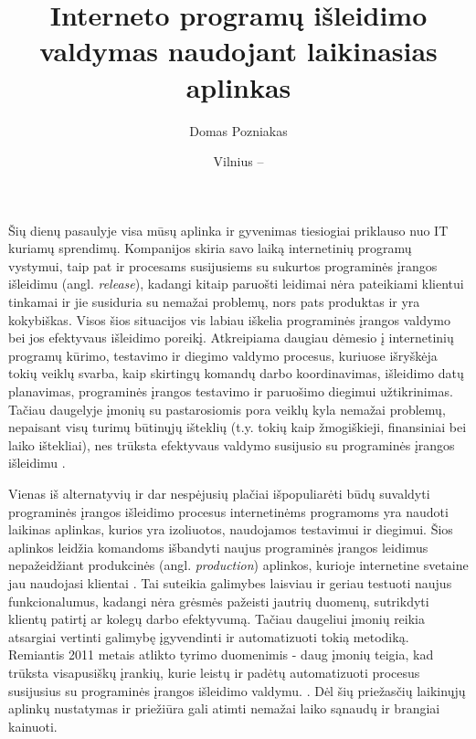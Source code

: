 \documentclass{VUMIFPSkursinis}
\institute{Informatikos institutas}  %
\title{Interneto programų išleidimo valdymas naudojant laikinasias aplinkas}
\author{Domas Pozniakas}
\date{Vilnius – \the\year}
\begin{document}
\maketitle

\tableofcontents


Šių dienų pasaulyje visa mūsų aplinka ir gyvenimas tiesiogiai priklauso nuo IT kuriamų sprendimų. Kompanijos skiria savo laiką internetinių programų vystymui, taip pat ir procesams susijusiems su sukurtos programinės įrangos išleidimu (angl. \textit{release}), kadangi kitaip paruošti leidimai nėra pateikiami klientui tinkamai ir jie susiduria su nemažai problemų, nors pats produktas ir yra kokybiškas. Visos šios situacijos vis labiau iškelia programinės įrangos valdymo bei jos efektyvaus išleidimo poreikį. Atkreipiama daugiau dėmesio į internetinių programų kūrimo, testavimo ir diegimo valdymo procesus, kuriuose išryškėja tokių veiklų svarba, kaip skirtingų komandų darbo koordinavimas, išleidimo datų planavimas, programinės įrangos testavimo ir paruošimo diegimui užtikrinimas. Tačiau daugelyje įmonių su pastarosiomis pora veiklų kyla nemažai problemų, nepaisant visų turimų būtinųjų išteklių (t.y. tokių kaip žmogiškieji, finansiniai bei laiko ištekliai), nes trūksta efektyvaus valdymo susijusio su programinės įrangos išleidimu \cite{SaltPirmas}. 


Vienas iš alternatyvių ir dar nespėjusių plačiai išpopuliarėti būdų suvaldyti programinės įrangos išleidimo procesus internetinėms programoms yra naudoti laikinas aplinkas, kurios yra izoliuotos, naudojamos testavimui ir diegimui. Šios aplinkos leidžia komandoms išbandyti naujus programinės įrangos leidimus nepažeidžiant produkcinės (angl. \textit{production}) aplinkos, kurioje internetine svetaine jau naudojasi klientai \cite{SaltAntras}. Tai suteikia galimybes laisviau ir geriau testuoti naujus funkcionalumus, kadangi nėra grėsmės pažeisti jautrių duomenų, sutrikdyti klientų patirtį ar kolegų darbo efektyvumą. Tačiau daugeliui įmonių reikia atsargiai vertinti galimybę įgyvendinti ir automatizuoti tokią metodiką. Remiantis 2011 metais atlikto tyrimo duomenimis - daug įmonių teigia, kad trūksta visapusiškų įrankių, kurie leistų ir padėtų automatizuoti procesus susijusius su programinės įrangos išleidimo valdymu. \cite{SaltPirmas}. Dėl šių priežasčių laikinųjų aplinkų nustatymas ir priežiūra gali atimti nemažai laiko sąnaudų ir brangiai kainuoti.
\end{document}
